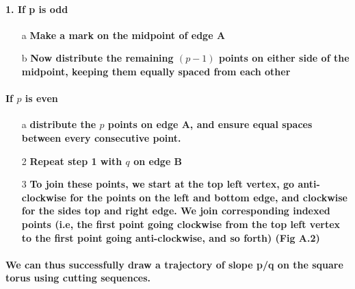 \documentclass{report}
\begin{document}
\paragraph{1. If p is odd}

\begin{enumerate}
\item[a] \textbf{Make a mark on the midpoint of edge A}

\item[b] \textbf{Now distribute the remaining $(p-1)$ points on either side of the midpoint, keeping them equally spaced from each other}
\end{enumerate}

\paragraph{\quad If $p$ is even}
\begin{enumerate}
\item[a] \textbf{distribute the $p$ points on edge A, and ensure equal spaces between every consecutive point.}
\end{enumerate}

\begin{enumerate}
\item[2] \textbf{Repeat step 1 with $q$ on edge B}

\item[3] \textbf{To join these points, we start at the top left vertex, go anti-clockwise for the points on the left and bottom edge, and clockwise for the sides top and right edge. We join corresponding indexed points (i.e, the first point going clockwise from the top left vertex to the first point going anti-clockwise, and so forth) (Fig A.2)}
\end{enumerate}


\paragraph{We can thus successfully draw a trajectory of slope p/q on the square torus using cutting sequences.}
\end{document}
